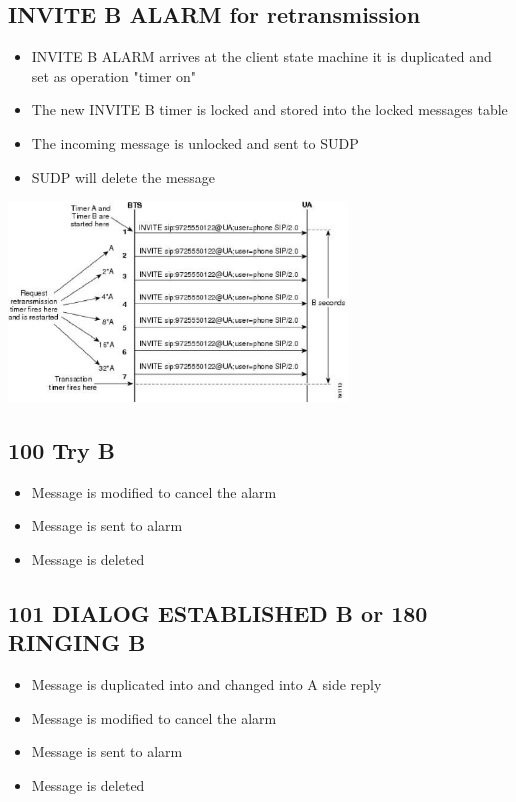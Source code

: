 \documentclass[a4paper]{article}
\begin{document}
\subsection{INVITE B ALARM for retransmission}

\begin {itemize}
\item INVITE B ALARM arrives at the client state machine it is duplicated and set as operation "timer on"
\item The new INVITE B timer is locked and stored into the locked messages table
\item The incoming message is unlocked and sent to SUDP
\item SUDP will delete the message
\end{itemize}

\includegraphics[width=90mm]{timerAlogic.eps}

\subsection{100 Try B}
\begin {itemize}
\item Message is modified to cancel the alarm
\item Message is sent to alarm
\item Message is deleted
\end{itemize}

\subsection{101 DIALOG ESTABLISHED B or 180 RINGING B}
\begin {itemize}
\item Message is duplicated into and changed into A side reply
\item Message is modified to cancel the alarm
\item Message is sent to alarm
\item Message is deleted
\end{itemize}
\end{document}
